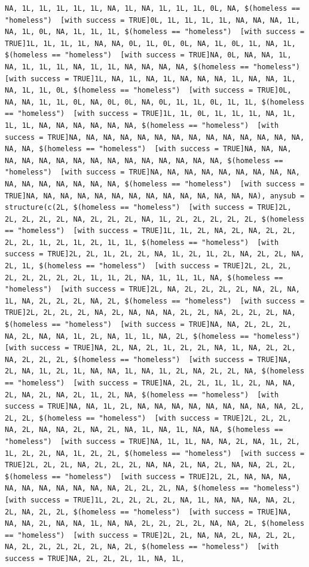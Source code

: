 \documentclass{tufte-book}\usepackage[]{graphicx}\usepackage[]{xcolor}
\makeatletter
\newenvironment{kframe}{%
 \def\at@end@of@kframe{}%
 \ifinner\ifhmode%
  \def\at@end@of@kframe{\end{minipage}}%
  \begin{minipage}{\columnwidth}%
 \fi\fi%
 \def\FrameCommand##1{\hskip\@totalleftmargin \hskip-\fboxsep
 \colorbox{shadecolor}{##1}\hskip-\fboxsep
     \hskip-\linewidth \hskip-\@totalleftmargin \hskip\columnwidth}%
 \MakeFramed {\advance\hsize-\width
   \@totalleftmargin\z@ \linewidth\hsize
   \@setminipage}}%
 {\par\unskip\endMakeFramed%
 \at@end@of@kframe}
\newenvironment{knitrout}{}{} %
\makeatother
\begin{document}
\begin{knitrout}
\begin{kframe}
\begin{verbatim}
NA, 1L, 1L, 1L, 1L, 1L, NA, 1L, NA, 1L, 1L, 1L, 0L, NA, $(homeless == "homeless")  [with success = TRUE]0L, 1L, 1L, 1L, 1L, NA, NA, NA, 1L, NA, 1L, 0L, NA, 1L, 1L, 1L, $(homeless == "homeless")  [with success = TRUE]1L, 1L, 1L, 1L, NA, NA, 0L, 1L, 0L, 0L, NA, 1L, 0L, 1L, NA, 1L, $(homeless == "homeless")  [with success = TRUE]NA, 0L, NA, NA, 1L, NA, 1L, 1L, 1L, NA, 1L, 1L, NA, NA, NA, NA, $(homeless == "homeless")  [with success = TRUE]1L, NA, 1L, NA, 1L, NA, NA, NA, 1L, NA, NA, 1L, NA, 1L, 1L, 0L, $(homeless == "homeless")  [with success = TRUE]0L, NA, NA, 1L, 1L, 0L, NA, 0L, 0L, NA, 0L, 1L, 1L, 0L, 1L, 1L, $(homeless == "homeless")  [with success = TRUE]1L, 1L, 0L, 1L, 1L, 1L, NA, 1L, 1L, 1L, NA, NA, NA, NA, NA, NA, $(homeless == "homeless")  [with success = TRUE]NA, NA, NA, NA, NA, NA, NA, NA, NA, NA, NA, NA, NA, NA, NA, NA, $(homeless == "homeless")  [with success = TRUE]NA, NA, NA, NA, NA, NA, NA, NA, NA, NA, NA, NA, NA, NA, NA, NA, $(homeless == "homeless")  [with success = TRUE]NA, NA, NA, NA, NA, NA, NA, NA, NA, NA, NA, NA, NA, NA, NA, NA, $(homeless == "homeless")  [with success = TRUE]NA, NA, NA, NA, NA, NA, NA, NA, NA, NA, NA, NA, NA, NA), anysub = structure(c(2L, $(homeless == "homeless")  [with success = TRUE]2L, 2L, 2L, 2L, 2L, NA, 2L, 2L, 2L, NA, 1L, 2L, 2L, 2L, 2L, 2L, $(homeless == "homeless")  [with success = TRUE]1L, 1L, 2L, NA, 2L, NA, 2L, 2L, 2L, 2L, 1L, 2L, 1L, 2L, 1L, 1L, $(homeless == "homeless")  [with success = TRUE]2L, 2L, 1L, 2L, 2L, NA, 1L, 2L, 1L, 2L, NA, 2L, 2L, NA, 2L, 1L, $(homeless == "homeless")  [with success = TRUE]2L, 2L, 2L, 2L, 2L, 2L, 2L, 2L, 1L, 1L, 2L, NA, 1L, 1L, 1L, NA, $(homeless == "homeless")  [with success = TRUE]2L, NA, 2L, 2L, 2L, 2L, NA, 2L, NA, 1L, NA, 2L, 2L, 2L, NA, 2L, $(homeless == "homeless")  [with success = TRUE]2L, 2L, 2L, 2L, NA, 2L, NA, NA, NA, 2L, 2L, NA, 2L, 2L, 2L, NA, $(homeless == "homeless")  [with success = TRUE]NA, NA, 2L, 2L, 2L, NA, 2L, NA, NA, 1L, 2L, NA, 1L, 1L, NA, 2L, $(homeless == "homeless")  [with success = TRUE]NA, 2L, NA, 2L, 1L, 2L, 2L, NA, 1L, NA, 2L, 2L, NA, 2L, 2L, 2L, $(homeless == "homeless")  [with success = TRUE]NA, 2L, NA, 1L, 2L, 1L, NA, NA, 1L, NA, 1L, 2L, NA, 2L, 2L, NA, $(homeless == "homeless")  [with success = TRUE]NA, 2L, 2L, 1L, 1L, 2L, NA, NA, 2L, NA, 2L, NA, 2L, 1L, 2L, NA, $(homeless == "homeless")  [with success = TRUE]NA, NA, 1L, 2L, NA, NA, NA, NA, NA, NA, NA, NA, NA, 2L, 2L, 2L, $(homeless == "homeless")  [with success = TRUE]2L, 2L, 2L, NA, 2L, NA, NA, 2L, NA, 2L, NA, 1L, NA, 1L, NA, NA, $(homeless == "homeless")  [with success = TRUE]NA, 1L, 1L, NA, NA, 2L, NA, 1L, 2L, 1L, 2L, 2L, NA, 1L, 2L, 2L, $(homeless == "homeless")  [with success = TRUE]2L, 2L, 2L, NA, 2L, 2L, 2L, NA, NA, 2L, NA, 2L, NA, NA, 2L, 2L, $(homeless == "homeless")  [with success = TRUE]2L, 2L, NA, NA, NA, NA, NA, NA, NA, NA, NA, NA, 2L, 2L, 2L, NA, $(homeless == "homeless")  [with success = TRUE]1L, 2L, 2L, 2L, 2L, NA, 1L, NA, NA, NA, NA, 2L, 2L, NA, 2L, 2L, $(homeless == "homeless")  [with success = TRUE]NA, NA, NA, 2L, NA, NA, 1L, NA, NA, 2L, 2L, 2L, 2L, NA, NA, 2L, $(homeless == "homeless")  [with success = TRUE]2L, 2L, NA, NA, 2L, NA, 2L, 2L, NA, 2L, 2L, 2L, 2L, 2L, NA, 2L, $(homeless == "homeless")  [with success = TRUE]NA, 2L, 2L, 2L, 1L, NA, 1L, 
\end{verbatim}
\end{kframe}
\end{knitrout}
\end{document}
